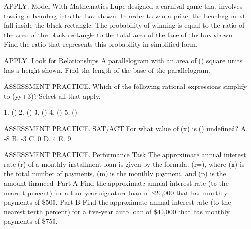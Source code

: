 \documentclass{article}
\newenvironment{practice}[2]{}{}        %
\newcommand{\answer}[1]{}               %
\newcommand{\placeholder}[2]{}          %
\newcommand{\uncertain}[2]{#1}          %
\newcommand{\te}[1]{}                   %
\begin{document}
\begin{practice}{36}{2}
APPLY. Model With Mathematics Lupe designed a carnival game that involves tossing a beanbag into the box shown. In order to win a prize, the beanbag must fall inside the black rectangle. The probability of winning is equal to the ratio of the area of the black rectangle to the total area of the face of the box shown. Find the ratio that represents this probability in simplified form.
\placeholder{illustration}{Overhead view of a child in orange tossing a green beanbag toward a gray rectangular board on grass. Board has decorative stars and swirls, width 3x along bottom and height x+1 at left. Black rectangular target has width x and height one-half x, with a white outline. Blue beanbag above left, orange one at lower right.}
\answer{The probability is (\frac{x}{6(x+1)}).}
\end{practice}
\begin{practice}{37}{2}
APPLY. Look for Relationships A parallelogram with an area of () square units has a height shown. Find the length of the base of the parallelogram.
\placeholder{diagram}{Unfilled parallelogram with horizontal top and bottom edges and sides slanting up right. Dashed perpendicular from top-left vertex to base, right-angle marker at foot, red height label (x+4)/(2x+5).}
\answer{The length of the base of the parallelogram is (\frac35) units.}
\end{practice}
\begin{practice}{38}{1}
ASSESSMENT PRACTICE. Which of the following rational expressions simplify to (\frac y{y+3})? Select all that apply.
\te{The printed choices are unlettered checkboxes; numbered here in their printed order. DOK \uncertain{1}{2 also printed in Item Analysis}.}
1. ()
2. ()
3. ()
4. ()
5. ()
\answer{Second and third expressions.}
\end{practice}
\begin{practice}{39}{1}
ASSESSMENT PRACTICE. SAT/ACT For what value of (x) is () undefined?
A. -8
B. -3
C. 0
D. 4
E. 9
\answer{B}
\end{practice}
\begin{practice}{40}{2}
ASSESSMENT PRACTICE. Performance Task The approximate annual interest rate (r) of a monthly installment loan is given by the formula:
(r=),
where (n) is the total number of payments, (m) is the monthly payment, and (p) is the amount financed.
Part A Find the approximate annual interest rate (to the nearest percent) for a four-year signature loan of \$20,000 that has monthly payments of \$500.
Part B Find the approximate annual interest rate (to the nearest tenth percent) for a five-year auto loan of \$40,000 that has monthly payments of \$750.
\answer{PART A 9\%. PART B 4.6\%.}
\end{practice}
\end{document}
